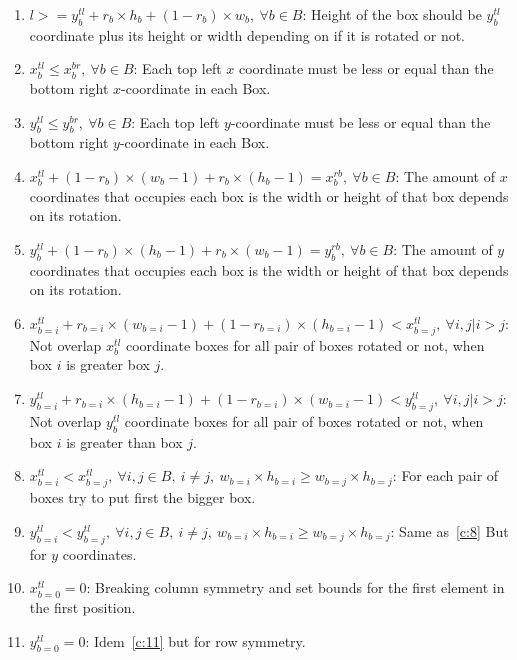 \documentclass[12pt, a4paper]{article}
\begin{document}
\begin{enumerate}

  \item $l >= y_b^{tl} + r_b \times h_b + (1-r_b) \times w_b,\ \forall b \in B$: Height of the box should be $y_b^{tl}$ coordinate plus its height or width depending on if it is rotated or not.

  \item $x_b^{tl} \leq x_b^{br},\ \forall b \in B$: Each top left $x$ coordinate must be less or equal than the bottom right $x$-coordinate in each Box.

  \item $y_b^{tl} \leq y_b^{br},\ \forall b \in B$: Each top left $y$-coordinate must be less or equal than the bottom right $y$-coordinate in each Box.

  \item\label{c:4} $x_b^{tl} + (1-r_b) \times (w_b-1) + r_b \times (h_b-1) = x_b^{rb},\ \forall b \in B$: The amount of $x$ coordinates that occupies each box is the width or height of that box depends on its rotation.

  \item\label{c:5} $y_b^{tl} + (1-r_b) \times (h_b-1) + r_b \times (w_b-1) = y_b^{rb},\ \forall b \in B$: The amount of $y$ coordinates that occupies each box is the width or height of that box depends on its rotation.

  \item\label{c:6} $x_{b=i}^{tl} + r_{b=i} \times (w_{b=i} - 1) + (1-r_{b=i}) \times (h_{b=i} - 1) < x_{b=j}^{tl},\ \forall i,j | i > j$: Not overlap $x_b^{tl}$ coordinate boxes for all pair of boxes rotated or not, when box $i$ is greater box $j$.

  \item\label{c:7} $y_{b=i}^{tl} + r_{b=i} \times (h_{b=i} - 1) + (1-r_{b=i}) \times (w_{b=i} - 1) < y_{b=j}^{tl},\ \forall i,j | i > j$: Not overlap $y_b^{tl}$ coordinate boxes for all pair of boxes rotated or not, when box $i$ is greater than box $j$.

  \item\label{c:8} $x_{b=i}^{tl} < x_{b=j}^{tl},\ \forall i,j \in B,\ i \neq j,\ w_{b=i} \times h_{b=i} \geq w_{b=j} \times h_{b=j}$: For each pair of boxes try to put first the bigger box.

  \item $y_{b=i}^{tl} < y_{b=j}^{tl},\ \forall i,j \in B,\ i \neq j,\ w_{b=i} \times h_{b=i} \geq w_{b=j} \times h_{b=j}$: Same as~\ref{c:8} But for $y$ coordinates.

  \item\label{c:11} $x_{b=0}^{tl} = 0$: Breaking column symmetry and set bounds for the first element in the first position.

  \item $y_{b=0}^{tl} = 0$: Idem~\ref{c:11} but for row symmetry.

\end{enumerate}
\end{document}
